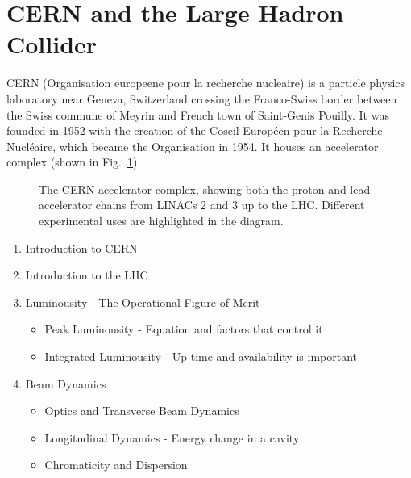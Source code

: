\section{CERN and the Large Hadron Collider}

CERN (Organisation europeene pour la recherche nucleaire) is a particle physics laboratory near Geneva, Switzerland crossing the Franco-Swiss border between the Swiss commune of Meyrin and French town of Saint-Genis Pouilly. It was founded in 1952 with the creation of the Coseil Europ\'{e}en pour la Recherche Nucl\'{e}aire, which became the Organisation in 1954. It houses an accelerator complex (shown in Fig.~\ref{fig:CERN-acc-complex})

\begin{figure}
\label{fig:CERN-acc-complex}
\caption{The CERN accelerator complex, showing both the proton and lead accelerator chains from LINACs 2 and 3 up to the LHC. Different experimental uses are highlighted in the diagram.}
\end{figure}

\begin{enumerate}
\item{Introduction to CERN}
\item{Introduction to the LHC}
\item{Luminousity - The Operational Figure of Merit}
\begin{itemize}
\item{Peak Luminousity - Equation and factors that control it}
\item{Integrated Luminousity - Up time and availability is important}
\end{itemize}
\item{Beam Dynamics}
\begin{itemize}
\item{Optics and Transverse Beam Dynamics}
\item{Longitudinal Dynamics - Energy change in a cavity}
\item{Chromaticity and Dispersion}
\end{itemize}
\end{enumerate}